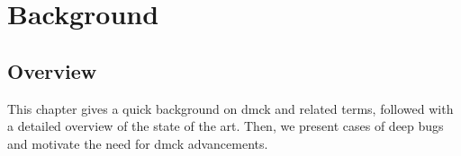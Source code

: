 
\chapter{Background}
\label{sec-mot}

\section{Overview}
This chapter gives a quick background on dmck and related terms,
followed with a detailed overview of the state of the art.  Then, we
present cases of deep bugs and motivate the need for dmck
advancements.

